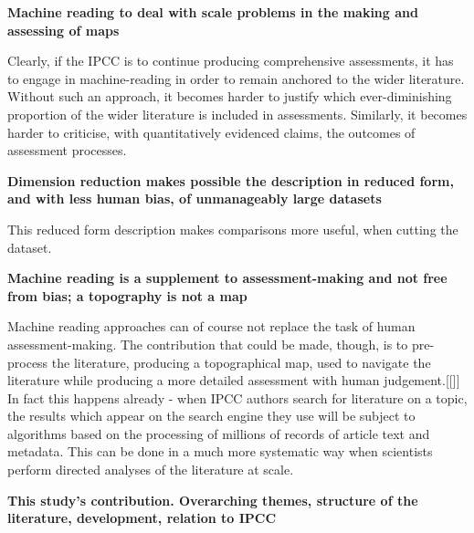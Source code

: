 \documentclass{article}
\begin{document}
\begin{linenumbers}


\bigskip
\noindent\textbf{Machine reading to deal with scale problems in the making and assessing of maps}


Clearly, if the IPCC is to continue producing comprehensive assessments, it has to engage in machine-reading in order to remain anchored to the wider literature. Without such an approach, it becomes harder to justify which ever-diminishing proportion of the wider literature is included in assessments. Similarly, it becomes harder to criticise, with quantitatively evidenced claims, the outcomes of assessment processes.


\bigskip
\noindent\textbf{Dimension reduction makes possible the description in reduced form, and with less human bias, of unmanageably large datasets}

\citep{Greene2016} \citep{Lee1999}

This reduced form description makes comparisons more useful, when cutting the dataset.

\bigskip
\noindent\textbf{Machine reading is a supplement to assessment-making and not free from bias; a topography is not a map}

Machine reading approaches can of course not replace the task of human assessment-making. The contribution that could be made, though, is to pre-process the literature, producing a topographical map, used to navigate the literature while producing a more detailed assessment with human judgement.[[]] In fact this happens already - when IPCC authors search for literature on a topic, the results which appear on the search engine they use will be subject to algorithms based on the processing of millions of records of article text and metadata. This can be done in a much more systematic way when scientists perform directed analyses of the literature at scale.


\bigskip
\noindent\textbf{This study's contribution. Overarching themes, structure of the literature, development, relation to IPCC}


\end{linenumbers}
\end{document}
